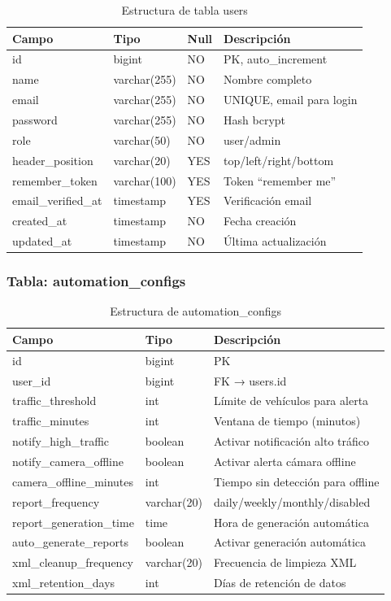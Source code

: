 \begin{table}[H]
\centering
\small
\begin{tabular}{|l|l|l|p{4cm}|}
\hline
\textbf{Campo} & \textbf{Tipo} & \textbf{Null} & \textbf{Descripción} \\
\hline
id & bigint & NO & PK, auto\_increment \\
name & varchar(255) & NO & Nombre completo \\
email & varchar(255) & NO & UNIQUE, email para login \\
password & varchar(255) & NO & Hash bcrypt \\
role & varchar(50) & NO & user/admin \\
header\_position & varchar(20) & YES & top/left/right/bottom \\
remember\_token & varchar(100) & YES & Token ``remember me'' \\
email\_verified\_at & timestamp & YES & Verificación email \\
created\_at & timestamp & NO & Fecha creación \\
updated\_at & timestamp & NO & Última actualización \\
\hline
\end{tabular}
\caption{Estructura de tabla users}
\end{table}

\subsubsection{Tabla: automation\_configs}

\begin{table}[H]
\centering
\small
\begin{tabular}{|l|l|p{6cm}|}
\hline
\textbf{Campo} & \textbf{Tipo} & \textbf{Descripción} \\
\hline
id & bigint & PK \\
user\_id & bigint & FK → users.id \\
traffic\_threshold & int & Límite de vehículos para alerta \\
traffic\_minutes & int & Ventana de tiempo (minutos) \\
notify\_high\_traffic & boolean & Activar notificación alto tráfico \\
notify\_camera\_offline & boolean & Activar alerta cámara offline \\
camera\_offline\_minutes & int & Tiempo sin detección para offline \\
report\_frequency & varchar(20) & daily/weekly/monthly/disabled \\
report\_generation\_time & time & Hora de generación automática \\
auto\_generate\_reports & boolean & Activar generación automática \\
xml\_cleanup\_frequency & varchar(20) & Frecuencia de limpieza XML \\
xml\_retention\_days & int & Días de retención de datos \\
\hline
\end{tabular}
\caption{Estructura de automation\_configs}
\end{table}

